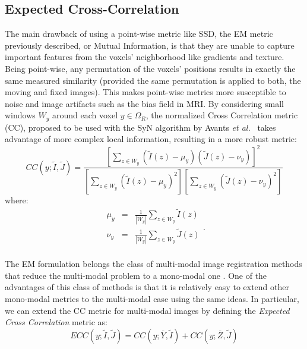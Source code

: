 \subsection{Expected Cross-Correlation}\label{sec:syn_ecc}
The main drawback of using a point-wise metric like SSD, the EM metric previously described, or Mutual Information, is that
they are unable to capture important features from the voxels' neighborhood like gradients and texture. Being point-wise, any permutation of the voxels' positions results in
exactly the same measured similarity (provided the same permutation is applied to both, the moving and fixed images). This makes point-wise metrics more susceptible to noise and image artifacts such as the bias field in MRI. By considering small windows $W_{y}$ around each voxel $y\in\Omega_{R}$, the normalized Cross Correlation metric (CC), proposed to
be used with the SyN algorithm by Avants {\it et al.}~\cite{Avants2008} takes advantage of more complex local information, resulting in a more robust metric:
\begin{equation}
    CC(y;\tilde{I}, \tilde{J}) = \frac{\left[\sum_{z\in W_{y}} \left(\tilde{I}(z) - \mu_{y}\right)\left(\tilde{J}(z) - \nu_{y}\right)\right]^{2}}
    {\left[\sum_{z \in W_{y}}\left(\tilde{I}(z) - \mu_{y}\right)^{2}\right] \left[\sum_{z \in W_{y}}\left(\tilde{J}(z) - \nu_{y}\right)^{2}\right]}
\end{equation}
where:
\begin{equation}
    \begin{array}{lll}
        \mu_{y} &=& \frac{1}{|W_{y}|}\sum_{z \in W_{y}}\tilde{I}(z)\\
        \nu_{y} &=& \frac{1}{|W_{y}|}\sum_{z \in W_{y}}\tilde{J}(z)\\
    \end{array}.
\end{equation}

The EM formulation belongs the class of multi-modal image registration methods that reduce the multi-modal problem to a mono-modal one \cite{Sotiras2013}. One of the advantages of this class of methods is that it is relatively easy to extend other mono-modal metrics to the multi-modal case using the same ideas. In particular, we can extend the CC metric for multi-modal images by defining the {\it Expected Cross Correlation} metric as:
\begin{equation}\label{eq:ecc_metric}
    ECC(y;\tilde{I}, \tilde{J}) = CC(y; \overline{Y}, \tilde{I}) + CC(y; \overline{Z}, \tilde{J})
\end{equation}

